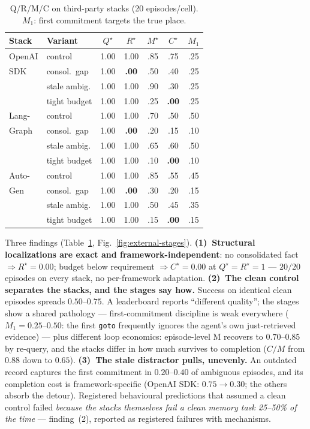\documentclass[letterpaper]{article} %
\newcommand{\method}[1]{\texttt{#1}}
\begin{document}
\begin{table}[t]
\caption{Q/R/M/C on third-party stacks (20 episodes/cell). $M_1$:
first commitment targets the true place.}
\label{tab:external}
\centering
\small
\setlength{\tabcolsep}{3.4pt}
\begin{tabular}{llccccc}
\toprule
Stack & Variant & $Q^\star$ & $R^\star$ & $M^\star$ & $C^\star$ & $M_1$ \\
\midrule
OpenAI & control      & 1.00 & 1.00 & .85 & .75 & .25 \\
SDK    & consol.\ gap & 1.00 & \textbf{.00} & .50 & .40 & .25 \\
       & stale ambig. & 1.00 & 1.00 & .90 & .30 & .25 \\
       & tight budget & 1.00 & 1.00 & .25 & \textbf{.00} & .25 \\
\midrule
Lang-  & control      & 1.00 & 1.00 & .70 & .50 & .50 \\
Graph  & consol.\ gap & 1.00 & \textbf{.00} & .20 & .15 & .10 \\
       & stale ambig. & 1.00 & 1.00 & .65 & .60 & .50 \\
       & tight budget & 1.00 & 1.00 & .10 & \textbf{.00} & .10 \\
\midrule
Auto-  & control      & 1.00 & 1.00 & .85 & .55 & .45 \\
Gen    & consol.\ gap & 1.00 & \textbf{.00} & .30 & .20 & .15 \\
       & stale ambig. & 1.00 & 1.00 & .50 & .45 & .35 \\
       & tight budget & 1.00 & 1.00 & .15 & \textbf{.00} & .15 \\
\bottomrule
\end{tabular}
\end{table}

Three findings (Table~\ref{tab:external},
Fig.~\ref{fig:external-stages}). \textbf{(1)~Structural localizations
are exact and framework-independent}: no consolidated fact
$\Rightarrow R^\star{=}0.00$; budget below requirement
$\Rightarrow C^\star{=}0.00$ at $Q^\star{=}R^\star{=}1$ --- $20/20$
episodes on every stack, no per-framework adaptation.
\textbf{(2)~The clean control separates the stacks, and the stages say
how.} Success on identical clean episodes spreads $0.50$--$0.75$. A
leaderboard reports ``different quality''; the stages show a shared
pathology --- first-commitment discipline is weak everywhere
($M_1{=}0.25$--$0.50$: the first \method{goto} frequently ignores the
agent's own just-retrieved evidence) --- plus different loop
economics: episode-level M recovers to $0.70$--$0.85$ by re-query, and
the stacks differ in how much survives to completion ($C/M$ from
$0.88$ down to $0.65$). \textbf{(3)~The stale distractor pulls,
unevenly.} An outdated record captures the first commitment in
$0.20$--$0.40$ of ambiguous episodes, and its completion cost is
framework-specific (OpenAI SDK: $0.75\!\to\!0.30$; the others absorb
the detour). Registered behavioural predictions that assumed a clean
control failed \emph{because the stacks themselves fail a clean memory
task 25--50\% of the time} --- finding~(2), reported as registered
failures with mechanisms.
\end{document}
